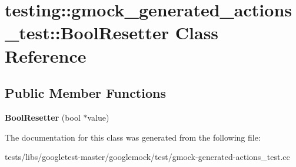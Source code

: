 \hypertarget{classtesting_1_1gmock__generated__actions__test_1_1BoolResetter}{}\section{testing\+:\+:gmock\+\_\+generated\+\_\+actions\+\_\+test\+:\+:Bool\+Resetter Class Reference}
\label{classtesting_1_1gmock__generated__actions__test_1_1BoolResetter}
\subsection*{Public Member Functions}
\begin{DoxyCompactItemize}
\item 
\mbox{\label{classtesting_1_1gmock__generated__actions__test_1_1BoolResetter_a55776cb9ef3b358e48898bb0257646ea}} 
{\bfseries Bool\+Resetter} (bool $\ast$value)
\end{DoxyCompactItemize}


The documentation for this class was generated from the following file\+:\begin{DoxyCompactItemize}
\item 
tests/libs/googletest-\/master/googlemock/test/gmock-\/generated-\/actions\+\_\+test.\+cc\end{DoxyCompactItemize}
